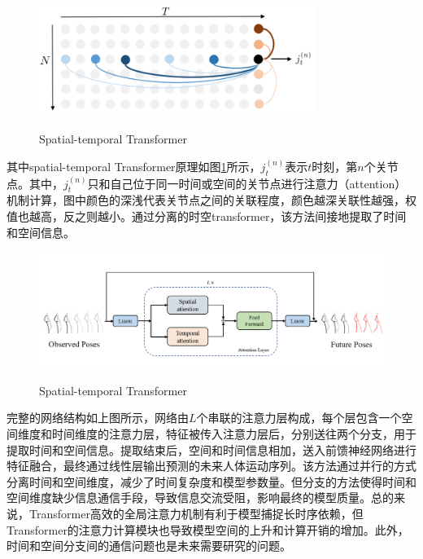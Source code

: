 \begin{figure}[ht]
    \centering
    \includegraphics[width=0.8\textwidth]{FigMa/ST-Transformer.png}\\
    \vspace{-0.3cm}
    \caption{Spatial-temporal Transformer\cite{aksan2021spatio}}
    \label{fig:Spatial-temporal_Transformer}
\end{figure}

其中spatial-temporal Transformer原理如图\ref{fig:Spatial-temporal_Transformer}所示，$j^{(n)}_t$表示$t$时刻，第$n$个关节点。其中，$j^{(n)}_t$只和自己位于同一时间或空间的关节点进行注意力（attention）机制计算，图中颜色的深浅代表关节点之间的关联程度，颜色越深关联性越强，权值也越高，反之则越小。通过分离的时空transformer，该方法间接地提取了时间和空间信息。

\begin{figure}[ht]
    \centering
    \includegraphics[width=1\textwidth]{FigMa/ST_Transformer.png}\\
    \vspace{-0.3cm}
    \caption{Spatial-temporal Transformer\cite{aksan2021spatio}}
    \label{fig:Spatial-temporal_Transformer网络结构}
\end{figure}

完整的网络结构如上图所示，网络由$L$个串联的注意力层构成，每个层包含一个空间维度和时间维度的注意力层，特征被传入注意力层后，分别送往两个分支，用于提取时间和空间信息。提取结束后，空间和时间信息相加，送入前馈神经网络进行特征融合，最终通过线性层输出预测的未来人体运动序列。该方法通过并行的方式分离时间和空间维度，减少了时间复杂度和模型参数量。但分支的方法使得时间和空间维度缺少信息通信手段，导致信息交流受阻，影响最终的模型质量。总的来说，Transformer高效的全局注意力机制有利于模型捕捉长时序依赖，但Transformer的注意力计算模块也导致模型空间的上升和计算开销的增加。此外，时间和空间分支间的通信问题也是未来需要研究的问题。

